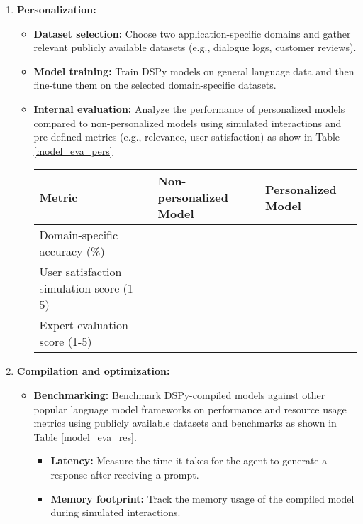 \begin{enumerate}
\begin{itemize}
        \end{itemize}

    \item \textbf{Personalization:}
            \begin{itemize}
                \item \textbf{Dataset selection:} Choose two application-specific domains and gather relevant publicly available datasets (e.g., dialogue logs, customer reviews).
                \item \textbf{Model training:} Train DSPy models on general language data and then fine-tune them on the selected domain-specific datasets.
                \item \textbf{Internal evaluation:} Analyze the performance of personalized models compared to non-personalized models using simulated interactions and pre-defined metrics (e.g., relevance, user satisfaction) as show in Table \ref{model_eva_pers}
                \begin{center}
                    \label{model_eva_pers}
                    \begin{tabular}{ |p{4cm}|p{3cm}|p{3cm}|  }
                    \hline \textbf{Metric} & \textbf{Non-personalized Model} & \textbf{Personalized Model}\\
                    \hline
                    Domain-specific accuracy (\%)&&\\
                    \hline
                    User satisfaction simulation score (1-5)&&\\
                    \hline
                    Expert evaluation score (1-5)&&\\
                     \hline
                    \end{tabular}
                \end{center}
            \end{itemize}

    \item \textbf{Compilation and optimization:}
            \begin{itemize}
                \item \textbf{Benchmarking:} Benchmark DSPy-compiled models against other popular language model frameworks on performance and resource usage metrics using publicly available datasets and benchmarks as shown in Table \ref{model_eva_res}.

                \begin{itemize}
                    \item \textbf{Latency:} Measure the time it takes for the agent to generate a response after receiving a prompt.
                    \item \textbf{Memory footprint:} Track the memory usage of the compiled model during simulated interactions.
                \end{itemize}


\end{itemize}
\end{enumerate}
